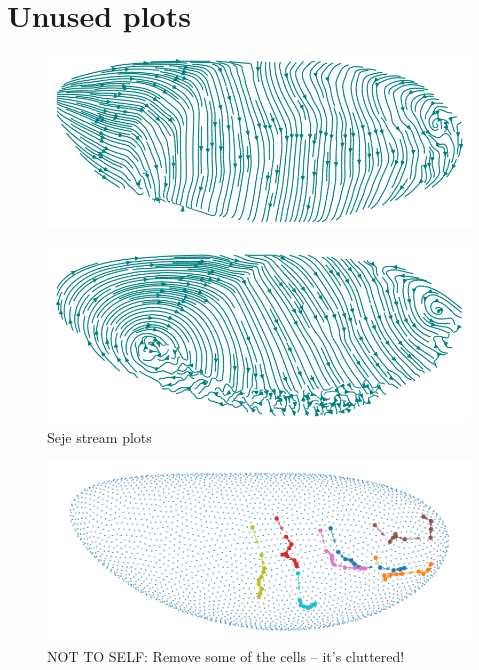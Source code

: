 \chapter*{Unused plots}
\label{App:Plots}
\begin{figure}[H]
    \centering
    \includegraphics[width=1\linewidth]{chapters/Appendix/streamplot1.png}
\end{figure}
\begin{figure}[H]
    \centering
    \includegraphics[width=1\linewidth]{chapters/Appendix/streamplot2.png}
    \caption{Seje stream plots}
    \label{fig:enter-label}
\end{figure}

\begin{figure}[H]
    \centering
    \includegraphics[width=1\linewidth]{chapters/Results/figures/movements.png}
    \caption{NOT TO SELF: Remove some of the cells -- it's cluttered!}
    \label{fig:GBMovements}
\end{figure}

